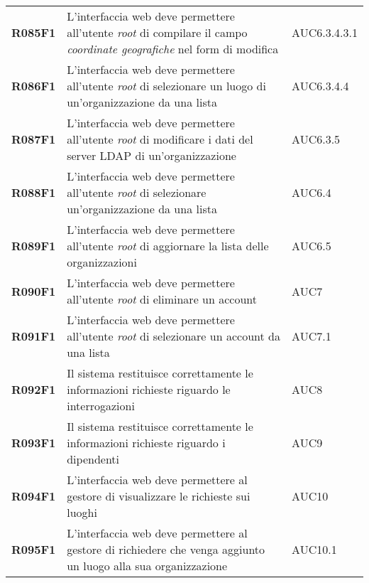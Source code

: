 \documentclass[../analisi-dei-requisiti]{subfiles}
\begin{document}
\begin{longtable}[H]{>{\centering\bfseries}m{3cm} >{\centering}m{10cm} >{\centering\arraybackslash}m{3cm}}
  R085F1                  & L'interfaccia web deve permettere all'utente \textit{root} di compilare il campo \textit{coordinate geografiche} nel form di modifica          & AUC6.3.4.3.1                  \\
  R086F1                  & L'interfaccia web deve permettere all'utente \textit{root} di selezionare un luogo di un'organizzazione da una lista                           & AUC6.3.4.4                    \\
  R087F1                  & L'interfaccia web deve permettere all'utente \textit{root} di modificare i dati del server LDAP di un'organizzazione                           & AUC6.3.5                      \\
  R088F1                  & L'interfaccia web deve permettere all'utente \textit{root} di selezionare un'organizzazione da una lista                                       & AUC6.4                        \\
  R089F1                  & L'interfaccia web deve permettere all'utente \textit{root} di aggiornare la lista delle organizzazioni                                         & AUC6.5                        \\
  R090F1                  & L'interfaccia web deve permettere all'utente \textit{root} di eliminare un account                                                             & AUC7                          \\
  R091F1                  & L'interfaccia web deve permettere all'utente \textit{root} di selezionare un account da una lista                                              & AUC7.1                        \\
  R092F1                  & Il sistema restituisce correttamente le informazioni richieste riguardo le interrogazioni                                                      & AUC8                          \\
  R093F1                  & Il sistema restituisce correttamente le informazioni richieste riguardo i dipendenti                                                           & AUC9                          \\
  R094F1                  & L'interfaccia web deve permettere al gestore di visualizzare le richieste sui luoghi                                                           & AUC10                         \\
  R095F1                  & L'interfaccia web deve permettere al gestore di richiedere che venga aggiunto un luogo alla sua organizzazione                                 & AUC10.1                       \\

\end{longtable}
\end{document}
